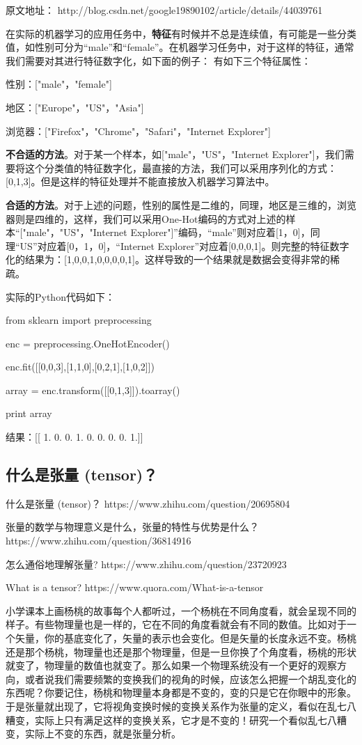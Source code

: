 \documentclass[UTF8]{ctexart}
\begin{document}
原文地址： http://blog.csdn.net/google19890102/article/details/44039761

在实际的机器学习的应用任务中，\textbf{特征}有时候并不总是连续值，有可能是一些分类值，如性别可分为“male”和“female”。在机器学习任务中，对于这样的特征，通常我们需要对其进行特征数字化，如下面的例子：
有如下三个特征属性：

性别：["male"，"female"]

地区：["Europe"，"US"，"Asia"]

浏览器：["Firefox"，"Chrome"，"Safari"，"Internet Explorer"]

\textbf{不合适的方法}。对于某一个样本，如["male"，"US"，"Internet Explorer"]，我们需要将这个分类值的特征数字化，最直接的方法，我们可以采用序列化的方式：[0,1,3]。但是这样的特征处理并不能直接放入机器学习算法中。

\textbf{合适的方法}。对于上述的问题，性别的属性是二维的，同理，地区是三维的，浏览器则是四维的，这样，我们可以采用One-Hot编码的方式对上述的样本“["male"，"US"，"Internet Explorer"]”编码，“male”则对应着[1，0]，同理“US”对应着[0，1，0]，“Internet Explorer”对应着[0,0,0,1]。则完整的特征数字化的结果为：[1,0,0,1,0,0,0,0,1]。这样导致的一个结果就是数据会变得非常的稀疏。

实际的Python代码如下：

from sklearn import preprocessing

enc = preprocessing.OneHotEncoder()

enc.fit([[0,0,3],[1,1,0],[0,2,1],[1,0,2]])

array = enc.transform([[0,1,3]]).toarray()

print array

结果：[[ 1.  0.  0.  1.  0.  0.  0.  0.  1.]]

\subsection{什么是张量 (tensor)？}
什么是张量 (tensor)？ https://www.zhihu.com/question/20695804

张量的数学与物理意义是什么，张量的特性与优势是什么？ https://www.zhihu.com/question/36814916

怎么通俗地理解张量? https://www.zhihu.com/question/23720923

What is a tensor? https://www.quora.com/What-is-a-tensor


小学课本上画杨桃的故事每个人都听过，一个杨桃在不同角度看，就会呈现不同的样子。有些物理量也是一样的，它在不同的角度看就会有不同的数值。比如对于一个矢量，你的基底变化了，矢量的表示也会变化。但是矢量的长度永远不变。杨桃还是那个杨桃，物理量也还是那个物理量，但是一旦你换了个角度看，杨桃的形状就变了，物理量的数值也就变了。那么如果一个物理系统没有一个更好的观察方向，或者说我们需要频繁的变换我们的视角的时候，应该怎么把握一个胡乱变化的东西呢？你要记住，杨桃和物理量本身都是不变的，变的只是它在你眼中的形象。于是张量就出现了，它将视角变换时候的变换关系作为张量的定义，看似在乱七八糟变，实际上只有满足这样的变换关系，它才是不变的！研究一个看似乱七八糟变，实际上不变的东西，就是张量分析。
\end{document}
